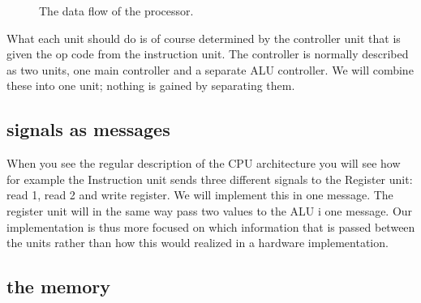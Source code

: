 \documentclass[a4paper,11pt]{article}
\begin{document}
\begin{figure}
  \centering 
  \caption{The data flow of the processor.} \label{fig:flow}
\end{figure}

What each unit should do is of course determined by the controller
unit that is given the op code from the instruction unit. The controller is
normally described as two units, one main controller and a separate
ALU controller. We will combine these into one unit; nothing is gained
by separating them.


\subsection*{signals as messages}

When you see the regular description of the CPU architecture you will
see how for example the Instruction unit sends three different signals to
the Register unit: read 1, read 2 and write register. We will
implement this in one message. The register unit will in the same way
pass two values to the ALU i one message.  Our implementation is thus
more focused on which information that is passed between the units
rather than how this would realized in a hardware implementation.

\subsection*{the memory}
\end{document}
